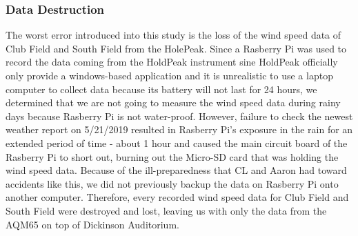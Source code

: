 \documentclass[review]{elsarticle}
\begin{document}
\subsubsection{Data Destruction}
\label{sec:analysis:erroranalysis:datadestruction}
The worst error introduced into this study is the loss of the wind speed data of Club Field and South Field from the HolePeak. Since a Rasberry Pi was used 
to record the data coming from the HoldPeak instrument sine HoldPeak officially only provide a windows-based application and it is unrealistic to use a laptop 
computer to collect data because its battery will not last for 24 hours, we determined that we are not going to measure the wind speed data during rainy days 
because Rasberry Pi is not water-proof. However, failure to check the newest weather report on 5/21/2019 resulted in Rasberry Pi's exposure in the rain for an 
extended period of time - about 1 hour and caused the main circuit board of the Rasberry Pi to short out, burning out the Micro-SD card that was holding the 
wind speed data. Because of the ill-preparedness that CL and Aaron had toward accidents like this, we did not previously backup the data on Rasberry Pi onto 
another computer. Therefore, every recorded wind speed data for Club Field and South Field were destroyed and lost, leaving us with only the data from the AQM65 
on top of Dickinson Auditorium.


\clearpage
    
\end{document}
